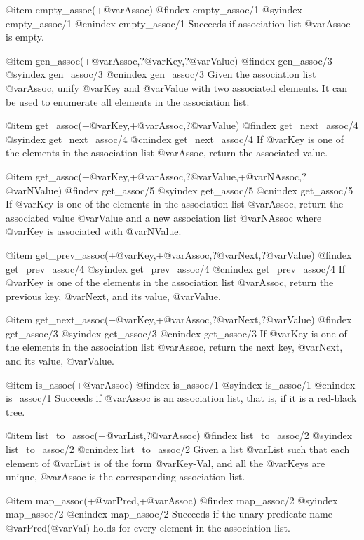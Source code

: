 {{{{{{{{{@item empty_assoc(+@var{Assoc})
@findex empty_assoc/1
@syindex empty_assoc/1
@cnindex empty_assoc/1
Succeeds if association list @var{Assoc} is empty.

@item gen_assoc(+@var{Assoc},?@var{Key},?@var{Value})
@findex gen_assoc/3
@syindex gen_assoc/3
@cnindex gen_assoc/3
Given the association list @var{Assoc}, unify @var{Key} and @var{Value}
with two associated elements. It can be used to enumerate all elements
in the association list.

@item get_assoc(+@var{Key},+@var{Assoc},?@var{Value})
@findex get_next_assoc/4
@syindex get_next_assoc/4
@cnindex get_next_assoc/4
If @var{Key} is one of the elements in the association list @var{Assoc},
return the associated value.

@item get_assoc(+@var{Key},+@var{Assoc},?@var{Value},+@var{NAssoc},?@var{NValue})
@findex get_assoc/5
@syindex get_assoc/5
@cnindex get_assoc/5
If @var{Key} is one of the elements in the association list @var{Assoc},
return the associated value @var{Value} and a new association list
@var{NAssoc} where @var{Key} is associated with @var{NValue}.

@item get_prev_assoc(+@var{Key},+@var{Assoc},?@var{Next},?@var{Value})
@findex get_prev_assoc/4
@syindex get_prev_assoc/4
@cnindex get_prev_assoc/4
If @var{Key} is one of the elements in the association list @var{Assoc},
return the previous key, @var{Next}, and its value, @var{Value}.

@item get_next_assoc(+@var{Key},+@var{Assoc},?@var{Next},?@var{Value})
@findex get_assoc/3
@syindex get_assoc/3
@cnindex get_assoc/3
If @var{Key} is one of the elements in the association list @var{Assoc},
return the next key, @var{Next}, and its value, @var{Value}.

@item is_assoc(+@var{Assoc})
@findex is_assoc/1
@syindex is_assoc/1
@cnindex is_assoc/1
Succeeds if @var{Assoc} is an association list, that is, if it is a
red-black tree.

@item list_to_assoc(+@var{List},?@var{Assoc})
@findex list_to_assoc/2
@syindex list_to_assoc/2
@cnindex list_to_assoc/2
Given a list @var{List} such that each element of @var{List} is of the
form @var{Key-Val}, and all the @var{Keys} are unique, @var{Assoc} is
the corresponding association list.

@item map_assoc(+@var{Pred},+@var{Assoc})
@findex map_assoc/2
@syindex map_assoc/2
@cnindex map_assoc/2
Succeeds if the unary predicate name @var{Pred}(@var{Val}) holds for every
element in the association list.

}}}}}}}}}
